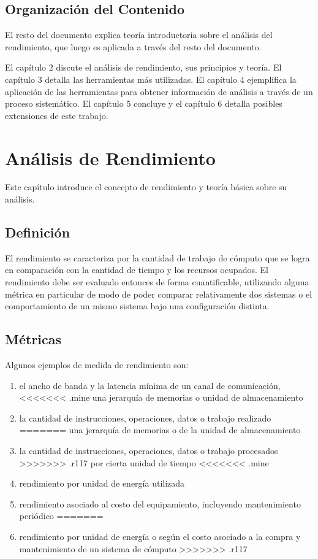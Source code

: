 \documentclass[a4paper]{report}
\begin{document}
\section{Organizaci\'on del Contenido}

El resto del documento explica teor\'ia introductoria sobre el an\'alisis del rendimiento, que luego es
aplicada a trav\'es del resto del documento.

\bigskip

El cap\'itulo 2 discute el an\'alisis de rendimiento, sus
principios y teor\'ia. El cap\'itulo 3 detalla las herramientas m\'as
utilizadas. El cap\'itulo 4 ejemplifica la aplicaci\'on de las herramientas
para obtener informaci\'on de an\'alisis a trav\'es de un proceso sistem\'atico.
El cap\'itulo 5 concluye y el cap\'itulo 6 detalla posibles extensiones de este trabajo.

\chapter{An\'alisis de Rendimiento}

Este cap\'itulo introduce el concepto de rendimiento y teor\'ia b\'asica sobre su an\'alisis.

\section{Definici\'on}

El rendimiento se caracteriza por la cantidad de trabajo de c\'omputo que se
logra en comparaci\'on con la cantidad de tiempo y los recursos ocupados.
El rendimiento debe ser evaluado entonces de forma cuantificable, utilizando alguna
m\'etrica en particular de modo de poder comparar relativamente dos sistemas o
el comportamiento de un mismo sistema bajo una configuraci\'on distinta.

\section{M\'etricas}

Algunos ejemplos de medida de rendimiento son:

\begin{enumerate}
\item el ancho de banda y la latencia m\'inima de un canal de comunicaci\'on,
<<<<<<< .mine
  una jerarqu\'ia de memorias o unidad de almacenamiento
\item la cantidad de instrucciones, operaciones, datos o trabajo realizado
=======
  una jerarqu\'ia de memorias o de la unidad de almacenamiento
\item la cantidad de instrucciones, operaciones, datos o trabajo procesados
>>>>>>> .r117
  por cierta unidad de tiempo
<<<<<<< .mine
\item rendimiento por unidad de energ\'ia utilizada
\item rendimiento asociado al costo del equipamiento, incluyendo mantenimiento peri\'odico
=======
\item rendimiento por unidad de energ\'ia o seg\'un el costo asociado a la compra
y mantenimiento de un sistema de c\'omputo
>>>>>>> .r117
\end{enumerate}
\end{document}
